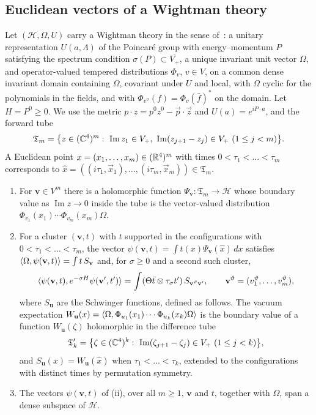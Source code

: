 \subsection{Euclidean vectors of a Wightman theory}\label{ssec:euclid}

Let $(\mathcal H,\Omega,U)$ carry a Wightman theory in the sense
of~\cite[Ch.~3]{SW64}: a unitary representation $U(a,\Lambda)$ of the
Poincar\'e group with energy--momentum $P$ satisfying the spectrum condition
$\sigma(P)\subset\overline{V_+}$, a unique invariant unit vector $\Omega$,
and operator-valued tempered distributions $\Phi_v$, $v\in V$, on a common
dense invariant domain containing $\Omega$, covariant under $U$ and local,
with $\Omega$ cyclic for the polynomials in the fields, and with
$\Phi_{v^\vartheta}(f)=\Phi_v(\bar f)^*$ on the domain. Let $H=P^0\ge0$. We use
the metric $p\cdot z=p^0z^0-\vec p\cdot\vec z$ and $U(a)=e^{iP\cdot a}$, and the
forward tube
\[
\mathfrak T_m=\bigl\{z\in(\mathbb{C}^4)^m:\ \operatorname{Im}z_1\in V_+,\
\operatorname{Im}(z_{j+1}-z_j)\in V_+\ (1\le j<m)\bigr\}.
\]
A Euclidean point $x=(x_1,\dots,x_m)\in(\mathbb{R}^4)^m$ with times $0<\tau_1<\dots<
\tau_m$ corresponds to $\hat x=((i\tau_1,\vec x_1),\dots,(i\tau_m,\vec x_m))
\in\mathfrak T_m$.

\begin{lemma}[Euclidean vectors]\label{lem:wightman}
\begin{enumerate}[label=\textup{(\roman*)},leftmargin=*]
\item For $\mathbf v\in V^m$ there is a holomorphic function $\Psi_{\mathbf v}:
\mathfrak T_m\to\mathcal H$ whose boundary value as $\operatorname{Im}z\to0$
inside the tube is the vector-valued distribution $\Phi_{v_1}(x_1)\cdots
\Phi_{v_m}(x_m)\Omega$.
\item For a cluster $(\mathbf v,t)$ with $t$ supported in the configurations
with $0<\tau_1<\dots<\tau_m$, the vector $\psi(\mathbf v,t)=\int t(x)
\Psi_{\mathbf v}(\hat x)\,dx$ satisfies $\langle \Omega,\psi(\mathbf v,t)\rangle=
\int t\,S_{\mathbf v}$ and, for $\sigma\ge0$ and a second such cluster,
\[
\langle \psi(\mathbf v,t),e^{-\sigma H}\psi(\mathbf v',t')\rangle=\int(\Theta\bar t\otimes
\tau_\sigma t')\,S_{\mathbf v^\vartheta\mathbf v'},\qquad
\mathbf v^\vartheta=(v_1^\vartheta,\dots,v_m^\vartheta),
\]
where $S_{\mathbf u}$ are the Schwinger functions, defined as follows. The
vacuum expectation $W_{\mathbf u}(x)=\langle \Omega,\Phi_{u_1}(x_1)\cdots
\Phi_{u_k}(x_k)\Omega\rangle$ is the boundary value of a function
$W_{\mathbf u}(\zeta)$ holomorphic in the difference tube
\[
\mathfrak T'_k=\bigl\{\zeta\in(\C^4)^k:\ \operatorname{Im}(\zeta_{j+1}-\zeta_j)
\in V_+\ (1\le j<k)\bigr\},
\]
and $S_{\mathbf u}(x)=W_{\mathbf u}(\hat x)$ when $\tau_1<\dots<\tau_k$,
extended to the configurations with distinct times by permutation
symmetry.
\item The vectors $\psi(\mathbf v,t)$ of (ii), over all $m\ge1$, $\mathbf v$
and $t$, together with $\Omega$, span a dense subspace of $\mathcal H$.
\end{enumerate}
\end{lemma}

